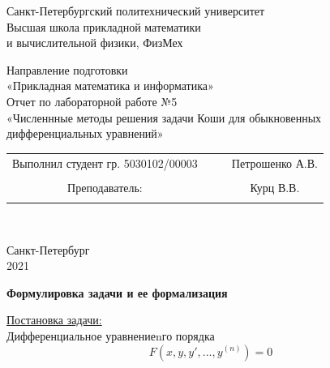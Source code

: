 \documentclass{article}
\begin{document}
	\begin{center}
		\hfill \break
		\begin{center}
			\huge{Санкт-Петербургский политехнический университет\\
				Высшая школа прикладной математики\\
				и вычислительной физики, ФизМех}
		\end{center}
		\hfill \break
		\hfill \break
		\hfill \break
		\hfill \break
		\hfill \break
		\huge{Направление подготовки\\
			«Прикладная математика и информатика»}\\
		\hfill \break
		\hfill \break
		\hfill \break
		\hfill \break
		\hfill \break
		\hfill \break
		\fontsize{14pt}{14pt}\selectfont
		Отчет по лабораторной работе №5\\
		«Численнные методы решения задачи Коши для обыкновенных дифференциальных уравнений»\\
		\hfill \break
		\hfill \break
		\hfill \break
		\hfill \break
		\hfill \break
	\end{center}
	\hfill \break
	\hfill \break
	\fontsize{12pt}{12pt}\selectfont
	\begin{tabular}{cccc}
		\hspace{1cm}Выполнил студент гр. 5030102/00003 & {\hspace{3cm}} & & Петрошенко А.В. \\\\
		\hspace{-3cm}Преподаватель: &{\hspace{1cm}}& & {\hspace{1cm}} Курц В.В. \\\\
	\end{tabular}\\
	\hfill \break
	\hfill \break
	\hfill \break
	\hfill \break
	\hfill \break
	\hfill \break
	\begin{center} Санкт-Петербург\\ 
		2021\\
	\end{center}
	\thispagestyle{empty}
	\newpage
	\begin{center} \textbf{Формулировка задачи и ее формализация}\end{center}
	\underline{Постановка задачи:}\\
	Дифференциальное уравнениеn­го порядка
	\begin{equation}
		F(x, y, y', ..., y^{(n)}) = 0
	\end{equation}
\end{document}
